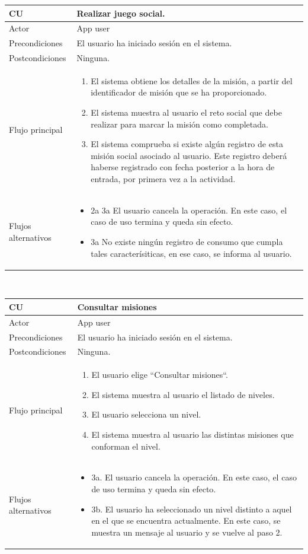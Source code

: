 \documentclass[twoside]{report}
\newcommand\addrow[2]{#1 &#2\\ }
\newcommand\addheading[2]{#1 &#2\\ \hline}
\newcommand\tabularhead{\begin{tabular}{lp{0.7\textwidth}}
\hline
}
\newenvironment{usecase}{\tabularhead}
{\hline\end{tabular}}
\begin{document}
\begin{usecase}
  \addheading{\textbf{CU\arabic{usecase}}}{Realizar juego social.} 
  \addrow{Actor}{App user}
  \addrow{Precondiciones}{El usuario ha iniciado sesión en el sistema.}
  \addrow{Postcondiciones}{Ninguna.}
  \addrow{Flujo principal}{
  		\begin{enumerate}
  		\item El sistema obtiene los detalles de la misión, a partir del identificador de misión que se ha proporcionado. %
  		\item El sistema muestra al usuario el reto social que debe realizar para marcar la misión como completada. %
  		\item El sistema comprueba si existe algún registro de esta misión social asociado al usuario. Este registro deberá haberse registrado con fecha posterior a la hora de entrada, por primera vez a la actividad. %
  		\end{enumerate}
  }
  \addrow{Flujos alternativos}{
  		\begin{itemize}
  		\item 2a 3a El usuario cancela la operación. En este caso, el caso de uso termina y queda sin efecto.
  		\item 3a No existe ningún registro de consumo que cumpla tales caracterísiticas, en ese caso, se informa al usuario.
  		\end{itemize}
  }
\end{usecase}\\

\vspace{0.5cm}

\begin{usecase}
  \addheading{\textbf{CU\arabic{usecase}}}{Consultar misiones} 
  \addrow{Actor}{App user}
  \addrow{Precondiciones}{El usuario ha iniciado sesión en el sistema.}
  \addrow{Postcondiciones}{Ninguna.}
  \addrow{Flujo principal}{
  		\begin{enumerate}
  		\item El usuario elige “Consultar misiones“. %
  		\item El sistema muestra al usuario el listado de niveles. %
  		\item El usuario selecciona un nivel. %
  		\item El sistema muestra al usuario las distintas misiones que conforman el nivel. %
  		\end{enumerate}
  }
  \addrow{Flujos alternativos}{
  		\begin{itemize}
  		\item 3a. El usuario cancela la operación. En este caso, el caso de uso termina y queda sin efecto.
  		\item 3b. El usuario ha seleccionado un nivel distinto a aquel en el que se encuentra actualmente. En este caso, se muestra un mensaje al usuario y se vuelve al paso 2.
  		\end{itemize}
  }
\end{usecase}\\
\end{document}
